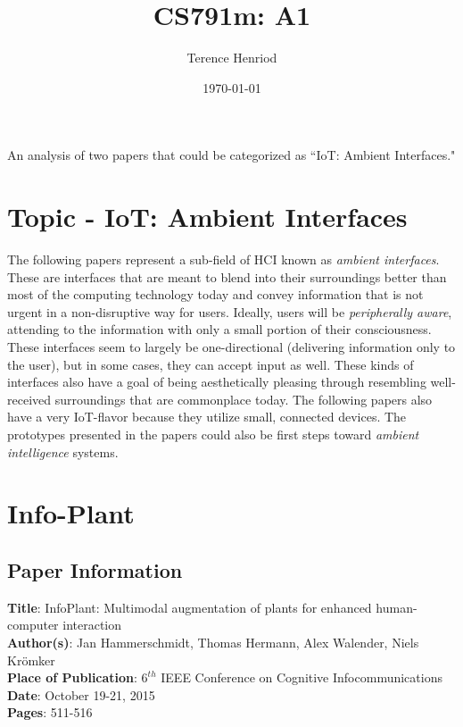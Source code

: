 \documentclass{article}
\title{CS791m: A1}
\author{Terence Henriod}
\date{\today}
\begin{document}
\maketitle

An analysis of two papers that could be categorized as ``IoT: Ambient Interfaces."

\newpage
\section{Topic - IoT: Ambient Interfaces}
The following papers represent a sub-field of HCI known as \emph{ambient interfaces}. These are interfaces that are meant to blend into their surroundings better than most of the computing technology today and convey information that is not urgent in a non-disruptive way for users. Ideally, users will be \emph{peripherally aware}, attending to the information with only a small portion of their consciousness. These interfaces seem to largely be one-directional (delivering information only to the user), but in some cases, they can accept input as well. These kinds of interfaces also have a goal of being aesthetically pleasing through resembling well-received surroundings that are commonplace today. The following papers also have a very IoT-flavor because they utilize small, connected devices. The prototypes presented in the papers could also be first steps toward \emph{ambient intelligence} systems.

\section{Info-Plant}

\subsection{Paper Information}
\noindent
\textbf{Title}: InfoPlant: Multimodal augmentation of plants for enhanced human-computer interaction \\
\textbf{Author(s)}: Jan Hammerschmidt, Thomas Hermann, Alex Walender, Niels Kr{\"o}mker \\
\textbf{Place of Publication}: $6^{th}$ IEEE Conference on Cognitive Infocommunications \\
\textbf{Date}: October 19-21, 2015 \\
\textbf{Pages}: 511-516 \\
\end{document}
